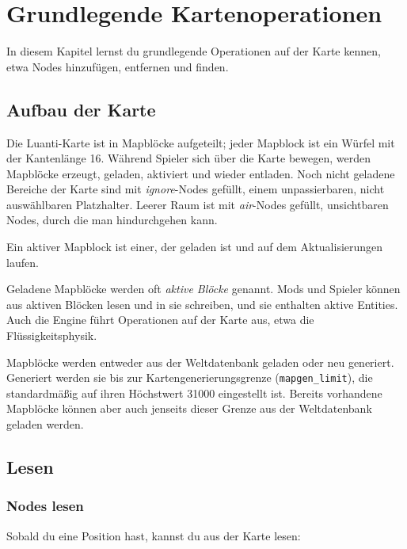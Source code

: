 \chapter{Grundlegende Kartenoperationen}
\label{ch:map/environment}

In diesem Kapitel lernst du grundlegende Operationen auf der Karte
kennen, etwa Nodes hinzufügen, entfernen und finden.

\section{Aufbau der Karte}\label{aufbau-der-karte}

Die Luanti-Karte ist in Mapblöcke aufgeteilt; jeder
Mapblock ist ein Würfel mit der Kantenlänge 16.
Während Spieler sich über die Karte bewegen, werden Mapblöcke erzeugt,
geladen, aktiviert und wieder entladen. Noch nicht geladene Bereiche der
Karte sind mit \emph{ignore}-Nodes gefüllt, einem unpassierbaren, nicht
auswählbaren Platzhalter. Leerer Raum ist mit \emph{air}-Nodes gefüllt,
unsichtbaren Nodes, durch die man hindurchgehen kann.

Ein aktiver Mapblock ist einer, der geladen ist und auf dem
Aktualisierungen laufen.

Geladene Mapblöcke werden oft \emph{aktive Blöcke} genannt. Mods und
Spieler können aus aktiven Blöcken lesen und in sie schreiben, und sie
enthalten aktive Entities. Auch die Engine führt
Operationen auf der Karte aus, etwa die Flüssigkeitsphysik.

Mapblöcke werden entweder aus der Weltdatenbank geladen oder neu
generiert. Generiert werden sie bis zur Kartengenerierungsgrenze
(\texttt{mapgen\_\allowbreak{}limit}), die standardmäßig auf ihren
Höchstwert 31000 eingestellt ist. Bereits vorhandene Mapblöcke können
aber auch jenseits dieser Grenze aus der Weltdatenbank geladen werden.

\section{Lesen}\label{lesen}

\subsection{Nodes lesen}\label{nodes-lesen}

Sobald du eine Position hast, kannst du aus der Karte lesen:

\begin{Shaded}
\begin{Highlighting}[]
  \OperatorTok{=} \OperatorTok{(\{}  \OperatorTok{=} \OperatorTok{,}  \OperatorTok{=} \OperatorTok{,}  \OperatorTok{=}  \OperatorTok{\})}
\OperatorTok{(}\OperatorTok{(}\OperatorTok{))} 
\end{Highlighting}
\end{Shaded}

